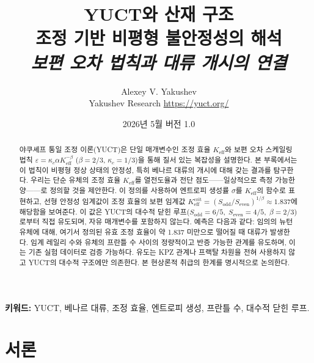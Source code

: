 \documentclass[12pt,a4paper]{article}
\begin{document}
	
	\title{\huge\textbf{YUCT와 산재 구조}\\[0.2cm]
		\Large 조정 기반 비평형 불안정성의 해석\\[0.3cm]
		\large \textit{보편 오차 법칙과 대류 개시의 연결}}
	\author{Alexey V. Yakushev\\[0.2cm] \small Yakushev Research \quad \url{https://yuct.org/}}
	\date{\small 2026년 5월 \quad 버전 1.0}
	\maketitle
	
	\begin{abstract}
		\noindent 
		야쿠셰프 통일 조정 이론(YUCT)은 단일 매개변수인 조정 효율 \(K_{\mathrm{eff}}\)와 보편 오차 스케일링 법칙 \(\varepsilon = \kappa_c\alpha K_{\mathrm{eff}}^{-\beta}\) (\(\beta = 2/3\), \(\kappa_c = 1/3\))을 통해 질서 있는 복잡성을 설명한다. 본 부록에서는 이 법칙이 비평형 정상 상태의 안정성, 특히 베나르 대류의 개시에 대해 갖는 결과를 탐구한다. 우리는 단순 유체의 조정 효율 \(K_{\mathrm{eff}}\)를 열전도율과 전단 점도——일상적으로 측정 가능한 양——로 정의할 것을 제안한다. 이 정의를 사용하여 엔트로피 생성률 \(\sigma\)를 \(K_{\mathrm{eff}}\)의 함수로 표현하고, 선형 안정성 임계값이 조정 효율의 보편 임계값 \(K_{\mathrm{eff}}^{\mathrm{crit}} = (S_{\mathrm{odd}}/S_{\mathrm{even}})^{1/\beta} \approx 1.837\)에 해당함을 보여준다. 이 값은 YUCT의 대수적 닫힌 루프(\(S_{\mathrm{odd}} = 6/5,\; S_{\mathrm{even}} = 4/5,\; \beta = 2/3\))로부터 직접 유도되며, 자유 매개변수를 포함하지 않는다. 예측은 다음과 같다: 임의의 뉴턴 유체에 대해, 여기서 정의된 유효 조정 효율이 약 1.837 미만으로 떨어질 때 대류가 발생한다. 임계 레일리 수와 유체의 프란틀 수 사이의 정량적이고 반증 가능한 관계를 유도하며, 이는 기존 실험 데이터로 검증 가능하다. 유도는 KPZ 관계나 프랙탈 차원을 전혀 사용하지 않고 YUCT의 대수적 구조에만 의존한다. 본 현상론적 취급의 한계를 명시적으로 논의한다.
	\end{abstract}
	\vspace{0.5cm}
	\noindent\textbf{키워드:} YUCT, 베나르 대류, 조정 효율, 엔트로피 생성, 프란틀 수, 대수적 닫힌 루프.
	
	\newpage
	\tableofcontents
	\newpage
	
	\section{서론}
	
\end{document}
